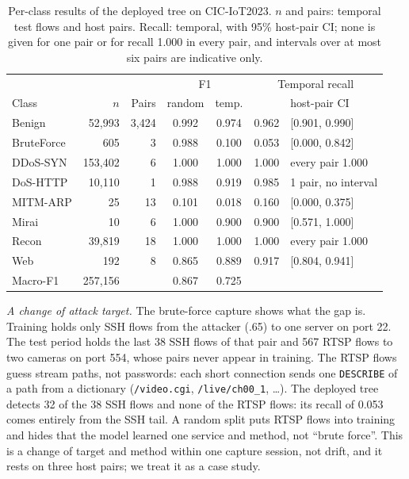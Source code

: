 \begin{table}[t]
\centering
\caption{Per-class results of the deployed tree on CIC-IoT2023. $n$ and pairs: temporal test flows and host pairs. Recall: temporal, with 95\% host-pair CI; none is given for one pair or for recall 1.000 in every pair, and intervals over at most six pairs are indicative only.}
\label{tab:perclass}
\footnotesize
\setlength{\tabcolsep}{3pt}
\begin{tabular}{lrrcccl}
\hline
 & & & \multicolumn{2}{c}{F1} & \multicolumn{2}{c}{Temporal recall} \\
Class & $n$ & Pairs & random & temp. & & host-pair CI \\
\hline
Benign     &  52,993 & 3,424 & 0.992 & 0.974 & 0.962 & [0.901, 0.990] \\
BruteForce &     605 &     3 & 0.988 & 0.100 & 0.053 & [0.000, 0.842] \\
DDoS-SYN   & 153,402 &     6 & 1.000 & 1.000 & 1.000 & every pair 1.000 \\
DoS-HTTP   &  10,110 &     1 & 0.988 & 0.919 & 0.985 & 1 pair, no interval \\
MITM-ARP   &      25 &    13 & 0.101 & 0.018 & 0.160 & [0.000, 0.375] \\
Mirai      &      10 &     6 & 1.000 & 0.900 & 0.900 & [0.571, 1.000] \\
Recon      &  39,819 &    18 & 1.000 & 1.000 & 1.000 & every pair 1.000 \\
Web        &     192 &     8 & 0.865 & 0.889 & 0.917 & [0.804, 0.941] \\
\hline
Macro-F1   & 257,156 &       & 0.867 & 0.725 & & \\
\hline
\end{tabular}
\end{table}

\emph{A change of attack target.} The brute-force capture shows what the gap is. Training holds only SSH flows from the attacker (.65) to one server on port 22. The test period holds the last 38 SSH flows of that pair and 567 RTSP flows to two cameras on port 554, whose pairs never appear in training. The RTSP flows guess stream paths, not passwords: each short connection sends one \texttt{DESCRIBE} of a path from a dictionary (\texttt{/video.cgi}, \texttt{/live/ch00\_1}, \ldots). The deployed tree detects 32 of the 38 SSH flows and none of the RTSP flows: its recall of 0.053 comes entirely from the SSH tail. A random split puts RTSP flows into training and hides that the model learned one service and method, not ``brute force''. This is a change of target and method within one capture session, not drift, and it rests on three host pairs; we treat it as a case study.

